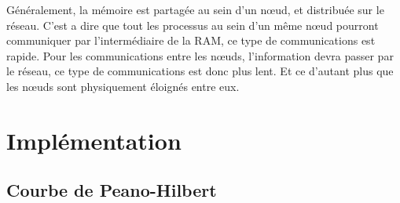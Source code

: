 %
%
%
%
%

Généralement, la mémoire est partagée au sein d'un nœud, et distribuée sur le réseau.
C'est a dire que tout les processus au sein d'un même nœud pourront communiquer par l'intermédiaire de la RAM, ce type de communications est rapide.
Pour les communications entre les nœuds, l'information devra passer par le réseau, ce type de communications est donc plus lent.
Et ce d'autant plus que les nœuds sont physiquement éloignés entre eux.

\section{Implémentation}

\subsection{Courbe de Peano-Hilbert}
\label{sec:parasoft}



